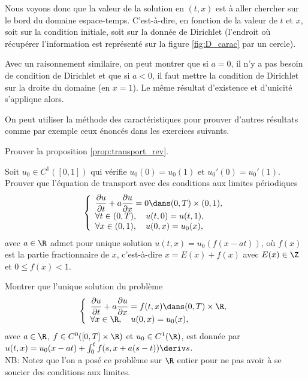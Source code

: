 \documentclass[12pt,a4paper,twoside]{article}
\begin{document}
Nous voyons donc que la valeur de la solution en $(t,x)$ est \`a aller chercher
sur le bord du domaine espace-temps. C'est-\`a-dire, en fonction de la valeur de 
$t$ et $x$, soit sur la condition initiale, soit sur la donn\'ee de Dirichlet
(l'endroit o\`u r\'ecup\'erer l'information est repr\'esent\'e sur la figure
\ref{fig:D_carac} par un cercle).


\begin{remark}
  Avec un raisonnement similaire, on peut montrer que si $a=0$, il n'y a pas besoin 
  de condition de Dirichlet et que si $a<0$, il faut mettre la condition de Dirichlet
  sur la droite du domaine (en $x=1$). 
  Le m\^eme r\'esultat d'existence et d'unicit\'e s'applique alors.
\end{remark}

On peut utiliser la m\'ethode des caract\'eristiques pour prouver d'autres r\'esultats
comme par exemple ceux \'enonc\'es dans les exercices suivants.
\begin{exercise}
  Prouver la proposition \ref{prop:transport_rev}.
\end{exercise}

\begin{exercise}
  \label{exo:carac_per}
  Soit $u_0 \in C^1([0,1])$ qui v\'erifie $u_0(0) = u_0(1)$ et $u_0'(0) = u_0'(1)$.
  Prouver que l'\'equation de transport avec des conditions aux limites p\'eriodiques
  \begin{equation}
    \label{eq:transport_per}
    \left\{
      \begin{array}{l}
        \dfrac{\partial u}{\partial t} + a \dfrac{\partial u}{\partial x} = 0 
        \dans (0,T) \times (0,1),
        \\
        \forall t \in (0,T), \quad u(t,0) = u(t,1) ,
        \\
        \forall x \in (0,1), \quad u(0,x) = u_0(x) ,
      \end{array}
    \right.
  \end{equation}
  avec $a\in \R$
  admet pour unique solution $u(t,x) = u_0(f(x-at))$,
  o\`u $f(x)$ est la partie fractionnaire de $x$,
  c'est-\`a-dire $x = E(x) + f(x)$ avec $E(x) \in \Z$
  et $0 \leq f(x) < 1$.
\end{exercise}

\begin{exercise}
  Montrer que l'unique solution du probl\`eme
  \begin{equation*}
    \left\{
      \begin{array}{l}
        \dfrac{\partial u}{\partial t} + a \dfrac{\partial u}{\partial x} = f(t,x)
        \dans (0,T) \times \R,
        \\
        \forall x \in \R, \quad u(0,x) = u_0(x) ,
      \end{array}
    \right.
  \end{equation*}
  avec $a \in \R$, $f \in C^0([0,T] \times \R)$ et $u_0 \in C^1(\R)$,
  est donn\'ee par 
  $u(t,x) = u_0(x-at) + \int_0^t f(s,x+a(s-t)) \deriv s$.
  \\
  NB: Notez que l'on a pos\'e ce probl\`eme sur $\R$ entier pour ne pas avoir
  \`a se soucier des conditions aux limites.
\end{exercise}
\end{document}
